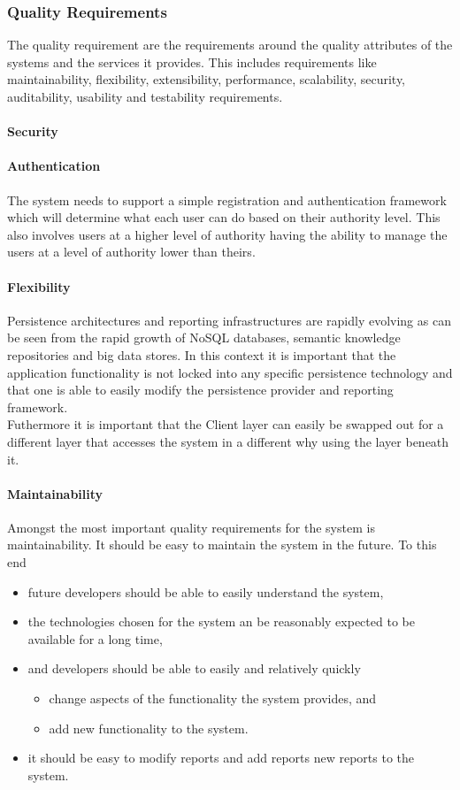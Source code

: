 \subsubsection{Quality Requirements}
\label{sec:qualityRequirementManagementSystem}
The quality requirement are the requirements around the quality attributes of
the systems and the services it provides. This includes requirements like
maintainability, flexibility, extensibility, performance, scalability, security,
auditability, usability and testability requirements.
\paragraph{Security}
\label{sec:securityQualityRequirement}
\paragraph{Authentication}
The system needs to support a simple registration and authentication framework
which will determine what each user can do based on their authority level. This
also involves users at a higher level of authority having the ability to manage
the users at a level of authority lower than theirs.
\paragraph{Flexibility}
Persistence architectures and reporting infrastructures are rapidly evolving as can
be seen from the rapid growth of NoSQL databases, semantic knowledge repositories and big data
stores. In this context it is important that the application functionality is not locked into any
specific persistence technology and that one is able to easily modify the persistence provider and
reporting framework.\\
Futhermore it is important that the Client layer can easily be swapped out for a different
layer that accesses the system in a different why using the layer beneath it.
\paragraph{Maintainability}
Amongst the most important quality requirements for the system is
maintainability. It should be easy to maintain the system in the future. To this end

\begin{itemize}
\item future developers should be able to easily understand the system,
\item the technologies chosen for the system an be reasonably expected to be available for a long
time,
\item and developers should be able to easily and relatively quickly
	\begin{itemize}
		\item change aspects of the functionality the system provides, and
		\item add new functionality to the system.
	\end{itemize}
\item it should be easy to modify reports and add reports new reports to the system.
\end{itemize}

